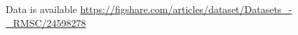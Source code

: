 \documentclass[sn-apa]{sn-jnl}
\begin{document}
Data is available \href{here.}{https://figshare.com/articles/dataset/Datasets_-_RMSC/24598278}
\end{document}
